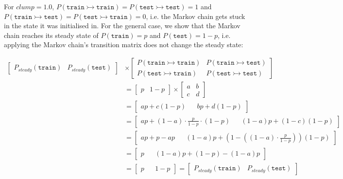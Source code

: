 \noindent For $clump = 1.0$, $P(\texttt{train} \rightarrowtail \texttt{train}) = P(\texttt{test} \rightarrowtail \texttt{test}) = 1$ and $P(\texttt{train} \rightarrowtail \texttt{test}) = P(\texttt{test} \rightarrowtail \texttt{train}) = 0$, i.e. the Markov chain gets stuck in the state it was initialised in. For the general case, we show that the Markov chain reaches its steady state of $P(\texttt{train}) = p$ and $P(\texttt{test}) = 1-p$, i.e. applying the Markov chain's transition matrix does not change the steady state:

\begin{equation*}
    \begin{split}
        \begin{bmatrix}
            P_{steady}(\texttt{train}) & P_{steady}(\texttt{test})
        \end{bmatrix} &\times \begin{bmatrix}
            P(\texttt{train} \rightarrowtail \texttt{train}) & P(\texttt{train} \rightarrowtail \texttt{test}) \\
            P(\texttt{test} \rightarrowtail \texttt{train}) & P(\texttt{test} \rightarrowtail \texttt{test})
        \end{bmatrix} \\
        &= \begin{bmatrix}
            p & 1-p
        \end{bmatrix} \times \begin{bmatrix}
            a & b \\
            c & d
        \end{bmatrix} \\
        &= \begin{bmatrix}
            ap + c(1-p) && bp + d(1-p)
        \end{bmatrix} \\
        &= \begin{bmatrix}
            ap + (1-a) \cdot \frac{p}{1-p} \cdot (1-p) && (1-a)p + (1-c)(1-p)
        \end{bmatrix} \\
        &= \begin{bmatrix}
            ap + p - ap && (1-a)p + (1-((1-a) \cdot \frac{p}{1-p}))(1-p)
        \end{bmatrix} \\
        &= \begin{bmatrix}
            p && (1-a)p + (1-p) - (1-a)p
        \end{bmatrix} \\
        &= \begin{bmatrix}
            p && 1-p
        \end{bmatrix} = \begin{bmatrix}
            P_{steady}(\texttt{train}) & P_{steady}(\texttt{test})
        \end{bmatrix}
    \end{split}
\end{equation*}

